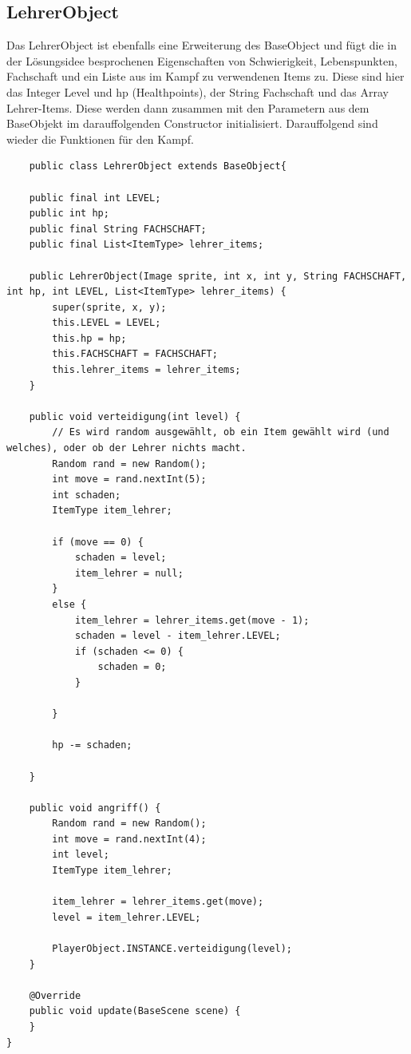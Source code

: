 \subsection{LehrerObject}
Das LehrerObject ist ebenfalls eine Erweiterung des BaseObject und fügt die in der Lösungsidee besprochenen Eigenschaften von Schwierigkeit, Lebenspunkten, Fachschaft und ein Liste aus im Kampf zu verwendenen Items zu. Diese sind hier das Integer Level und hp (Healthpoints), der String Fachschaft und das Array Lehrer-Items. Diese werden dann zusammen mit den Parametern aus dem BaseObjekt im darauffolgenden Constructor initialisiert. Darauffolgend sind wieder die Funktionen für den Kampf.
\\
\begin{lstlisting}
    public class LehrerObject extends BaseObject{

    public final int LEVEL;
    public int hp;
    public final String FACHSCHAFT;
    public final List<ItemType> lehrer_items;

    public LehrerObject(Image sprite, int x, int y, String FACHSCHAFT, int hp, int LEVEL, List<ItemType> lehrer_items) {
        super(sprite, x, y);
        this.LEVEL = LEVEL;
        this.hp = hp;
        this.FACHSCHAFT = FACHSCHAFT;
        this.lehrer_items = lehrer_items;
    }

    public void verteidigung(int level) {
        // Es wird random ausgewählt, ob ein Item gewählt wird (und welches), oder ob der Lehrer nichts macht.
        Random rand = new Random();
        int move = rand.nextInt(5);
        int schaden;
        ItemType item_lehrer;

        if (move == 0) {
            schaden = level;
            item_lehrer = null;
        }
        else {
            item_lehrer = lehrer_items.get(move - 1);
            schaden = level - item_lehrer.LEVEL;
            if (schaden <= 0) {
                schaden = 0;
            }

        }

        hp -= schaden;

    }
    
    public void angriff() {
        Random rand = new Random();
        int move = rand.nextInt(4);
        int level;
        ItemType item_lehrer;
        
        item_lehrer = lehrer_items.get(move);
        level = item_lehrer.LEVEL;
        
        PlayerObject.INSTANCE.verteidigung(level);
    }

    @Override
    public void update(BaseScene scene) {
    }
}
\end{lstlisting}


